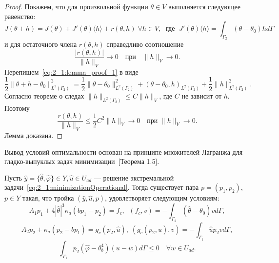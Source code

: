 \begin{proof}
    Покажем, что для произвольной функции $\theta \in V$ выполняется следующее равенство:
    \begin{equation}
        \label{eq:2_1:lemma_proof_1}
        J(\theta + h) = J(\theta) + J'(\theta)\langle h \rangle
        + r(\theta, h) \; \forall h \in V, \; \text{ где } \;
        J'(\theta)\langle h \rangle = \int_{\Gamma_2} (\theta - \theta_0)h d\Gamma
    \end{equation}
    и для остаточного члена $r(\theta,h)$ справедливо соотношение
    \begin{equation}
        \label{eq:2_1:lemma_proof_2}
        \frac{|r(\theta,h)|}{\|h\|_V} \rightarrow 0
        \quad \text{при} \quad \|h\|_V \rightarrow 0.
    \end{equation}
    Перепишем~\eqref{eq:2_1:lemma_proof_1} в виде
    \[
        \frac{1}{2} \|\theta + h - \theta_0\|^2_{L^2(\Gamma_2)} =
        \frac{1}{2} \| \theta - \theta_0 \|^2_{L^2(\Gamma_2)} +
        (\theta - \theta_0, h)_{L^2(\Gamma_2)} +
        \frac{1}{2}\| h \|^2_{L^2(\Gamma_2)}.
    \]
    Согласно теореме о следах $ \|h\|_{L^2(\Gamma_2)} \le C \|h\|_V $,
    где $C$ не зависит от $h$.
    Поэтому
    \[
        \frac{r(\theta,h)}{\| h \|_V} \leq
        \frac{1}{2} C^2 \| h \|_V \rightarrow 0 \quad \text{при } \| h \|_V \rightarrow 0.
    \]
    Лемма доказана.
\end{proof}

Вывод условий оптимальности основан на принципе множителей
Лагранжа для гладко-выпуклых задач минимизации~\cite{10}[Теорема 1.5].
\begin{theorem}
    \label{th:2_1:2}
    Пусть $\hat{y}=\{\hat{\theta},\hat{\varphi} \} \in Y, \hat{u} \in U_{ad}$
    --- решение экстремальной задачи~\eqref{eq:2_1:minimizationOperational}.
    Тогда существует пара $p = (p_1, p_2)$, $p \in Y$
    такая, что тройка $(\hat{y}, \hat{u}, p)$, удовлетворяет следующим условиям:
    \begin{equation}
        \label{eq:2_1:theorem_2_eq1}
        A_1 p_1 + 4 |\hat{\theta}|^3 \kappa_a(b p_1 - p_2) = f_c,
        \;\; (f_c,v) = - \int_{\Gamma_2} (\hat{\theta} - \theta_0) v d\Gamma,
    \end{equation}
    \begin{equation}
        \label{eq:2_1:theorem_2_eq2}
        A_2 p_2 + \kappa_a (p_2-b p_1) = g_c(p_2, \hat{u}),
        \;(g_c(p_2, \hat{u}), v) = -\int_{\Gamma_1} \hat{u} p_2 v d\Gamma,
    \end{equation}
    \begin{equation}
        \label{eq:2_1:theorem_2_eq3}
        \int_{\Gamma_1} p_2 (\hat{\varphi} - \theta_b^4)(u-w) d\Gamma
        \leq 0 \quad \forall w \in U_{ad}.
    \end{equation}
\end{theorem}

